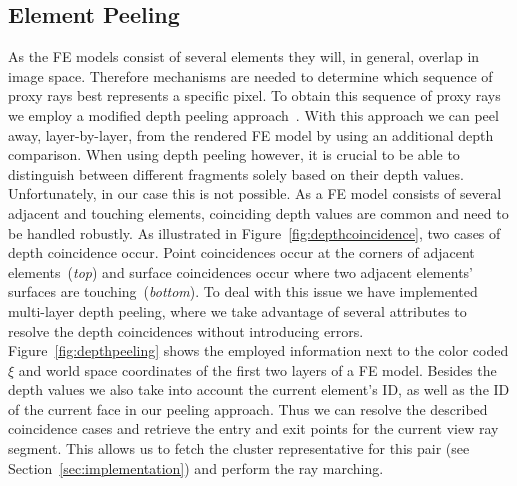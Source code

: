 \documentclass[journal]{vgtc}                %
\begin{document}
\subsection{Element Peeling}\label{subsec:peeling}
As the FE models consist of several elements they will, in general, overlap in image space. Therefore mechanisms are needed to determine which sequence of proxy rays best represents a specific pixel. To obtain this sequence of proxy rays we employ a modified depth peeling approach~\cite{mammen89DepthPeeling}. With this approach we can peel away, layer-by-layer, from the rendered FE model by using an additional depth comparison. When using depth peeling however, it is crucial to be able to distinguish between different fragments solely based on their depth values. Unfortunately, in our case this is not possible. As a FE model consists of several adjacent and touching elements, coinciding depth values are common and need to be handled robustly. As illustrated in Figure~\ref{fig:depthcoincidence}, two cases of depth coincidence occur. Point coincidences occur at the corners of adjacent elements~({\it top}) and surface coincidences occur where two adjacent elements' surfaces are touching~({\it bottom}). To deal with this issue we have implemented multi-layer depth peeling, where we take advantage of several attributes to resolve the depth coincidences without introducing errors. Figure~\ref{fig:depthpeeling} shows the employed information next to the color coded $\xi$ and world space coordinates of the first two layers of a FE model. Besides the depth values we also take into account the current element's ID, as well as the ID of the current face in our peeling approach. Thus we can resolve the described coincidence cases and retrieve the entry and exit points for the current view ray segment. This allows us to fetch the cluster representative for this pair (see Section~\ref{sec:implementation}) and perform the ray marching.
%
%
%
\end{document}
